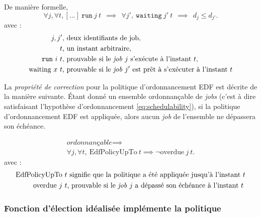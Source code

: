	De manière formelle,
	\begin{equation*}
		\forall j, \forall t, [...]~\mathtt{run}~j~t~~\implies~~\forall j',~\mathtt{waiting}~j'~t~~\implies~~d_j \leq d_{j'}.
	\end{equation*}
\indent avec :
	\begin{align*}
		j, j'&\text{, deux identifiants de job},\\
		t&\text{, un instant arbitraire},\\
		\mathtt{run}~i~t&\text{, prouvable si le \emph{job} $j$ s'exécute à l'instant $t$},\\ 
		\text{waiting}~x~t&\text{, prouvable si le \emph{job} $j'$ est prêt à s'exécuter à l'instant $t$}
	\end{align*}

	La \emph{propriété de correction} pour la politique d'ordonnancement EDF est décrite de la manière suivante.
	Étant donné un ensemble ordonnançable de \emph{jobs} (c'est à dire satisfaisant l'hypothèse d'ordonnancement \ref{eq:schedulability}), si la politique d'ordonnancement EDF est appliquée, alors aucun \emph{job} de l'ensemble ne dépassera son échéance.
	
	\begin{gather*}
		\textit{ordonnançable} \implies\\
  		\forall j, \forall t, ~\text{EdfPolicyUpTo}~t \implies \neg \text{overdue}~j~t.
	\end{gather*}
\indent	avec :
	\begin{align*}
		\text{EdfPolicyUpTo}~t&\text{ signifie que la politique a été appliquée jusqu'à l'instant}~t\\
		\text{overdue}~j~t&\text{, prouvable si le \emph{job} $j$ a dépassé son échéance à l'instant}~t
	\end{align*}

	\subsubsection{Fonction d'élection idéalisée implémente la politique}
	\label{sec:functional}

